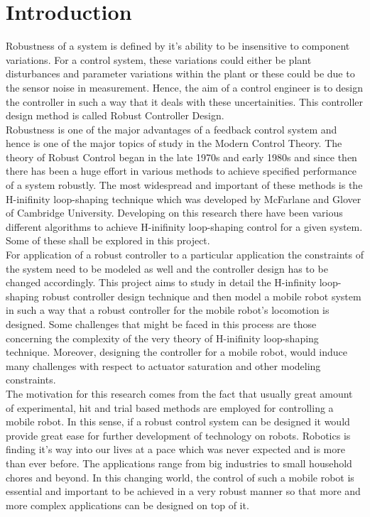 \documentclass[a4paper,12pt]{article}
\begin{document}
\section{Introduction}
Robustness of a system is defined by it's ability to be insensitive to component variations. For a control system, these variations could either be plant disturbances and parameter variations within the plant or these could be due to the sensor noise in measurement. Hence, the aim of a control engineer is to design the controller in such a way that it deals with these uncertainities. This controller design method is called Robust Controller Design. \\
Robustness is one of the major advantages of a feedback control system and hence is one of the major topics of study in the Modern Control Theory. The theory of Robust Control began in the late 1970s and early 1980s and since then there has been a huge effort in various methods to achieve specified performance of a system robustly. The most widespread and important of these methods is the H-inifinity loop-shaping technique which was developed by McFarlane and Glover of Cambridge University. Developing on this research there have been various different algorithms to achieve H-inifinity loop-shaping control for a given system. Some of these shall be explored in this project. \\
For application of a robust controller to a particular application the constraints of the system need to be modeled as well and the controller design has to be changed accordingly. This project aims to study in detail the H-infinity loop-shaping robust controller design technique and then model a mobile robot system in such a way that a robust controller for the mobile robot's locomotion is designed. Some challenges that might be faced in this process are those concerning the complexity of the very theory of  H-inifinity loop-shaping technique. Moreover, designing the controller for a mobile robot, would induce many challenges with respect to actuator saturation and other modeling constraints.\\
The motivation for this research comes from the fact that usually great amount of experimental, hit and trial based methods are employed for controlling a mobile robot. In this sense, if a robust control system can be designed it would provide great ease for further development of technology on robots. Robotics is finding it's way into our lives at a pace which was never expected and is more than ever before. The applications range from big industries to small household chores and beyond. In this changing world, the control of such a mobile robot is essential and important to be achieved in a very robust manner so that more and more complex applications can be designed on top of it.
\end{document}
